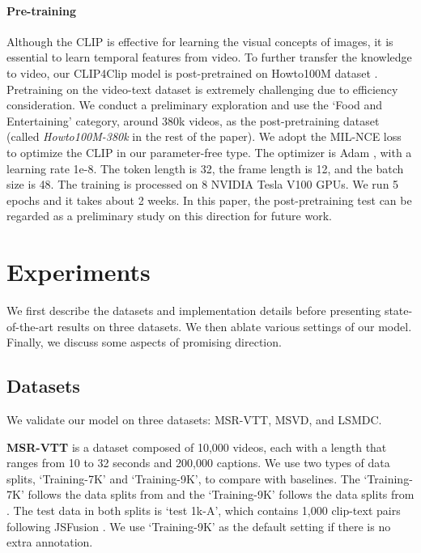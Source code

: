 \documentclass[11pt]{article}
\begin{document}
	\paragraph{Pre-training}
	Although the CLIP is effective for learning the visual concepts of images, it is essential to learn temporal features from video. To further transfer the knowledge to video, our CLIP4Clip model is post-pretrained on Howto100M dataset \cite{miech2019howto100m}. Pretraining on the video-text dataset is extremely challenging due to efficiency consideration. We conduct a preliminary exploration and use the `Food and Entertaining' category, around 380k videos, as the post-pretraining dataset (called \emph{Howto100M-380k} in the rest of the paper). We adopt the MIL-NCE loss \cite{miech19endtoend} to optimize the CLIP in our parameter-free type. The optimizer is Adam \cite{kingma2014adam}, with a learning rate 1e-8. The token length is 32, the frame length is 12, and the batch size is 48. The training is processed on 8 NVIDIA Tesla V100 GPUs. We run 5 epochs and it takes about 2 weeks. In this paper, the post-pretraining test can be regarded as a preliminary study on this direction for future work.

	\section{Experiments}
	We first describe the datasets and implementation details before presenting state-of-the-art results on three datasets. We then ablate various settings of our model. Finally, we discuss some aspects of promising direction.

	\subsection{Datasets}
	We validate our model on three datasets: MSR-VTT, MSVD, and LSMDC.

	\noindent
	\textbf{MSR-VTT} \cite{xu2016msr} is a dataset composed of 10,000 videos, each with a length that ranges from 10 to 32 seconds and 200,000 captions. We use two types of data splits, `Training-7K' and `Training-9K', to compare with baselines. The `Training-7K' follows the data splits from \cite{miech2019howto100m} and the `Training-9K' follows the data splits from \cite{Gabeur2020MMT}. The test data in both splits is `test 1k-A', which contains 1,000 clip-text pairs following JSFusion \cite{yu2018joint}. We use `Training-9K' as the default setting if there is no extra annotation.
\end{document}
